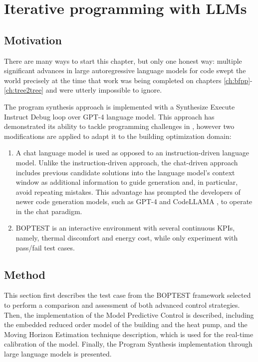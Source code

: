\chapter{Iterative programming with LLMs}
\label{ch:boptest}


\section{Motivation}

There are many ways to start this chapter, but only one honest way: multiple significant advances in large autoregressive language models for code swept the world precisely at the time that work was being completed on chapters \ref{ch:bfpp}-\ref{ch:tree2tree} and were utterly impossible to ignore.


The program synthesis approach is implemented with a Synthesize Execute Instruct Debug loop over GPT-4 \cite{GPT2023} language model. This approach has demonstrated its ability to tackle programming challenges in \cite{Reflexion2023,teaching2023,Fully2023}, however two modifications are applied to adapt it to the building optimization domain:

\begin{enumerate}
  \item A chat language model is used as opposed to an instruction-driven language model. Unlike the instruction-driven approach, the chat-driven approach includes previous candidate solutions into the language model’s context window as additional information to guide generation and, in particular, avoid repeating mistakes. This advantage has prompted the developers of newer code generation models, such as GPT-4 and CodeLLAMA \cite{Code2023}, to operate in the chat paradigm.
  \item BOPTEST is an interactive environment with several continuous KPIs, namely, thermal discomfort and energy cost, while \cite{Reflexion2023,teaching2023,Fully2023} only experiment with pass/fail test cases.
\end{enumerate}


\newpage
\section{Method}
This section first describes the test case from the BOPTEST framework selected to perform a comparison and assessment of both advanced control strategies. Then, the implementation of the Model Predictive Control is described, including the embedded reduced order model of the building and the heat pump, and the Moving Horizon Estimation technique description, which is used for the real-time calibration of the model. Finally, the Program Synthesis implementation through large language models is presented.

